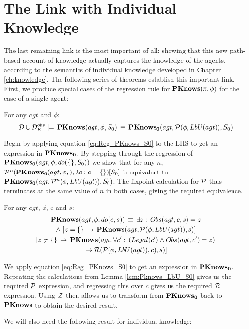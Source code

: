 \section{The Link with Individual Knowledge\label{sec:CKnowledge:Correctness}}

The last remaining link is the most important of all: showing that
this new path-based account of knowledge actually captures the knowledge
of the agents, according to the semantics of individual knowledge
developed in Chapter \ref{ch:knowledge}. The following series of
theorems establish this important link. First, we produce special
cases of the regression rule for $\mathbf{PKnows}(\pi,\phi)$ for the case
of a single agent:

\begin{lemma}
\label{lem:Pknows_LbU_S0}For any $agt$ and $\phi$:\[
\mathcal{D}\cup\mathcal{D}_{K}^{obs}\,\models\,\mathbf{PKnows}(agt,\phi,S_{0})\,\equiv\,\mathbf{PKnows_{0}}(agt,\mathcal{P}(\phi,LbU(agt)),S_{0})\]

\end{lemma}
\begin{proofsketch}
Begin by applying equation \eqref{eq:Reg_PKnows_S0} to the LHS to
get an expression in $\mathbf{PKnows_{0}}$. By stepping through the regression
of $\mathbf{PKnows_{0}}(agt,\phi,do(\{\},S_{0}))$ we show that for any $n$,
$\mathcal{P}^{n}(\mathbf{PKnows_{0}}(agt,\phi,),\lambda c:c=\{\})[S_{0}]$ is equivalent
to $\mathbf{PKnows_{0}}(agt,\mathcal{P}^{n}(\phi,LbU(agt)),S_{0})$. The fixpoint calculation
for $\mathcal{P}$ thus terminates at the same value of $n$ in both cases,
giving the required equivalence. 
\end{proofsketch}
\begin{lemma}
\label{lem:Pknows_LbU_do}For any $agt$, $\phi$, $c$ and $s$:\begin{multline*}
\mathbf{PKnows}(agt,\phi,do(c,s))\,\equiv\,\exists z:\, Obs(agt,c,s)=z\\
\wedge\,\left[z=\{\}\,\rightarrow\,\mathbf{PKnows}(agt,\mathcal{P}(\phi,LbU(agt)),s)\right]\\
\left[z\neq\{\}\,\rightarrow\,\mathbf{PKnows}(agt,\forall c':\,\left(Legal(c')\wedge Obs(agt,c')=z\right)\right.\\
\left.\rightarrow\mathcal{R}(\mathcal{P}(\phi,LbU(agt)),c),s)\right]\end{multline*}

\end{lemma}
\begin{proofsketch}
We apply equation \eqref{eq:Reg_PKnows_S0} to get an expression in
$\mathbf{PKnows_{0}}$. Repeating the calculations from Lemma \ref{lem:Pknows_LbU_S0}
gives us the required $\mathcal{P}$ expression, and regressing this over
$c$ gives us the required $\mathcal{R}$ expression. Using $\mathcal{Z}$ then
allows us to transform from $\mathbf{PKnows_{0}}$ back to $\mathbf{PKnows}$ to obtain
the desired result. 
\end{proofsketch}
We will also need the following result for individual knowledge:

